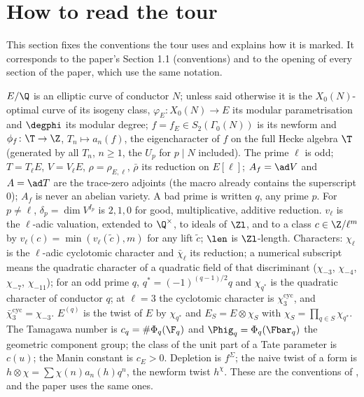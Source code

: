 \begin{sloppypar}
\section{How to read the tour}\label{sec:paper:reading}

This section fixes the conventions the tour uses and explains how it is marked. It corresponds to the paper's Section 1.1 (conventions) and to the
opening of every section of the paper, which use the same notation.

\begin{convention}\label{conv:paper:standing}
$E/\Q$ is an elliptic curve of conductor $N$; unless said otherwise it is the $X_0(N)$-optimal curve of its isogeny class, $\varphi_E\colon X_0(N)\to E$ its
modular parametrisation and $\degphi$ its modular degree; $f=f_E\in S_2(\Gamma_0(N))$ is its newform and $\phi_f\colon\T\to\Z$, $T_n\mapsto a_n(f)$, the eigencharacter of
$f$ on the full Hecke algebra $\T$ (generated by all $T_n$, $n\ge1$, the $U_p$ for $p\mid N$ included). The prime $\ell$ is odd; $T=T_\ell E$, $V=V_\ell E$, $\rho=\rho_{E,\ell}$, $\bar\rho$ its
reduction on $E[\ell]$; $A_f=\ad V$ and $A=\ad T$ are the trace-zero adjoints (the macro already contains the superscript $0$); $A_f$ is never an abelian
variety. A bad prime is written $q$, any prime $p$. For $p\ne\ell$, $\delta_p=\dim V^{I_p}$ is $2,1,0$ for good, multiplicative, additive reduction. $v_\ell$ is the
$\ell$-adic valuation, extended to $\Q^\times$, to ideals of $\Zl$, and to a class $c\in\Z/\ell^m$ by $v_\ell(c)=\min(v_\ell(\tilde c),m)$ for any lift $\tilde c$; $\len$ is
$\Zl$-length. Characters: $\chi_\ell$ is the $\ell$-adic cyclotomic character and $\bar\chi_\ell$ its reduction; a numerical subscript means the quadratic
character of a quadratic field of that discriminant ($\chi_{-3}$, $\chi_{-4}$, $\chi_{-7}$, $\chi_{-11}$); for an odd prime $q$, $q^*=(-1)^{(q-1)/2}q$ and $\chi_{q^*}$ is the
quadratic character of conductor $q$; at $\ell=3$ the cyclotomic character is $\chi_3^{\mathrm{cyc}}$, and $\bar\chi_3^{\mathrm{cyc}}=\chi_{-3}$. $E^{(q)}$ is the twist of $E$ by
$\chi_{q^*}$ and $E_S=E\otimes\chi_S$ with $\chi_S=\prod_{q\in S}\chi_{q^*}$. The Tamagawa number is $c_q=\#\Phi_q(\F_q)$ and $\Phig_q=\Phi_q(\Fbar_q)$ the geometric component
group; the class of the unit part of a Tate parameter is $c(u)$; the Manin constant is $c_E>0$. Depletion is $f^\Sigma$; the naive twist of a form is
$h\otimes\chi=\sum\chi(n)a_n(h)q^n$, the newform twist $h^\chi$. These are the conventions of , and the paper uses the same ones.
\end{convention}


\end{sloppypar}

